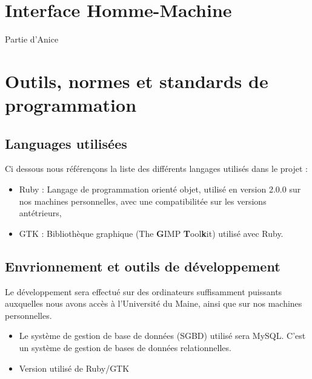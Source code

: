 \documentclass[11pt]{article}
\begin{document}

\newpage %

\section{Interface Homme-Machine}

Partie d'Anice

\newpage

\section{Outils, normes et standards de programmation}

\subsection{Languages utilisées}

Ci dessous nous référençons la liste des différents langages utilisés dans le projet : 

\begin{itemize}
	\item Ruby : Langage de programmation orienté objet, utilisé en version 2.0.0 sur nos machines personnelles, avec une compatibilitée sur les versions antétrieurs,
	\item GTK : Bibliothèque graphique (The \textbf{G}IMP \textbf{T}ool\textbf{k}it) utilisé avec Ruby.
\end{itemize}

\subsection{Envrionnement et outils de développement}

Le développement sera effectué sur des ordinateurs suffisamment puissants auxquelles nous avons accès à l'Université du Maine, ainsi que sur nos machines personnelles.

\begin{itemize}
		\item Le système de gestion de base de données (SGBD) utilisé sera MySQL. C'est un système de gestion de bases de données relationnelles.
		\item Version utilisé de Ruby/GTK
\end{itemize}
\end{document}
